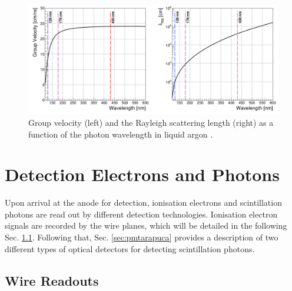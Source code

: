 \begin{figure}[ht!] 
\centering    
\includegraphics[width=1.0\textwidth]{vuv_visible}
\caption[Group Velocity and Rayleigh Scattering Length of Photons in Liquid Argon]{
Group velocity (left) and the Rayleigh scattering length (right) as a function of the photon wavelength in liquid argon \cite{PatrickPhD}.
}
\label{fig:vuv_visible}
\end{figure}

\section{Detection Electrons and Photons}

\label{sec3:detection}

Upon arrival at the anode for detection, ionisation electrons and scintillation photons are read out by different detection technologies.
Ionisation electron signals are recorded by the wire planes, which will be detailed in the following Sec. \ref{sec:wire}.
Following that, Sec. \ref{sec:pmtarapuca} provides a description of two different types of optical detectors for detecting scintillation photons.

\subsection{Wire Readouts}
\label{sec:wire}

